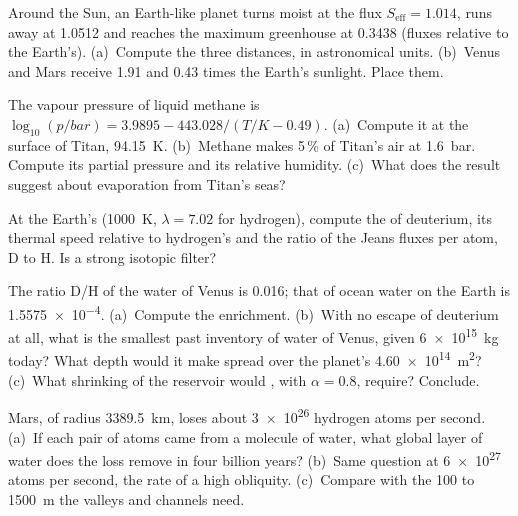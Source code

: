 \begin{exercise}[$\star$]\label{exo:b3:planetary-atmospheres:3}
Around the Sun, an Earth-like planet turns moist at the flux $S_\mathrm{eff}
= 1.014$, runs away at 1.0512 and reaches the maximum greenhouse at 0.3438
(fluxes relative to the Earth's). (a)~Compute the three distances, in
astronomical units. (b)~Venus and Mars receive 1.91 and 0.43 times the
Earth's sunlight. Place them.
\end{exercise}

\begin{exercise}[$\star$]\label{exo:b3:planetary-atmospheres:4}
The vapour pressure of liquid methane is $\log_{10}(p/\unit{bar}) = 3.9895 -
443.028/(T/\unit{K} - 0.49)$. (a)~Compute it at the surface of Titan,
\qty{94.15}{K}. (b)~Methane makes 5\,\% of Titan's air at \qty{1.6}{bar}.
Compute its partial pressure and its relative humidity. (c)~What does
the result suggest about evaporation from Titan's seas?
\end{exercise}

\begin{exercise}[$\star\star$]\label{exo:b3:planetary-atmospheres:5}
At the Earth's  (\qty{1000}{K}, $\lambda = 7.02$ for hydrogen),
compute the  of deuterium, its thermal speed relative to
hydrogen's and the ratio of the Jeans fluxes per atom, D to H. Is  a strong isotopic filter?
\end{exercise}

\begin{exercise}[$\star\star$]\label{exo:b3:planetary-atmospheres:6}
The ratio D/H of the water of Venus is \num{0.016}; that of ocean water on
the Earth is \num{1.5575e-4}. (a)~Compute the enrichment. (b)~With no
escape of deuterium at all, what is the smallest past inventory of water
of Venus, given \qty{6e15}{kg} today? What depth would it make spread over
the planet's \qty{4.60e14}{m^2}? (c)~What shrinking of the reservoir would
, with $\alpha = 0.8$, require? Conclude.
\end{exercise}

\begin{exercise}[$\star\star$]\label{exo:b3:planetary-atmospheres:7}
Mars, of radius \qty{3389.5}{km}, loses about \num{3e26} hydrogen atoms
per second. (a)~If each pair of atoms came from a molecule of water, what
global layer of water does the loss remove in four billion years?
(b)~Same question at \num{6e27} atoms per second, the rate of a high
obliquity. (c)~Compare with the 100 to \qty{1500}{m} the valleys and
channels need.
\end{exercise}


